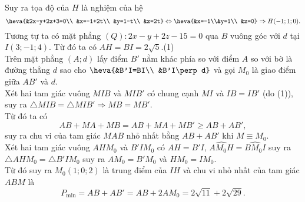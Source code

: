 \begin{ex}
{{
}
Suy ra tọa độ của $H$ là nghiệm của hệ
$$\heva{&2x-y+2z+3=0\\ &x=-1+2t\\ &y=1-t\\ &z=2t}\Leftrightarrow\heva{&x=-1\\&y=1\\ &z=0}\Rightarrow H(-1;1;0).$$
Tương tự ta có mặt phẳng $(Q): 2x-y+2z-15=0$ qua $B$ vuông góc với $d$ tại $I(3;-1;4)$. Từ đó ta có $AH=BI=2\sqrt{5}$.\hfill (1)\\
Trên mặt phẳng $(A;d)$ lấy điểm $B'$ nằm khác phía so với điểm $A$ so với bờ là đường thẳng $d$ sao cho $\heva{&B'I=BI\\ &B'I\perp d}$ và gọi $M_0$ là giao điểm giữa $AB'$ và $d$.\\
Xét hai tam giác vuông $MIB$ và $MIB'$ có chung cạnh $MI$ và $IB=IB'$ (do (1)), suy ra $\triangle MIB=\triangle MIB'\Rightarrow MB=MB'$.\\
Từ đó ta có 
$$AB+MA+MB=AB+MA+MB'\ge AB+AB',$$
suy ra chu vi của tam giác $MAB$ nhỏ nhất bằng $AB+AB'$ khi $M\equiv M_0$.\\
Xét hai tam giác vuông $AHM_0$ và $B'IM_0$ có $AH=B'I$, $\widehat{AM_0H}=\widehat{BM_0I}$ suy ra $\triangle AHM_0=\triangle B'IM_0$ suy ra $AM_0=B'M_0$ và $HM_0=IM_0$.\\
Từ đó suy ra $M_0(1;0;2)$ là trung điểm của $IH$ và chu vi nhỏ nhất của tam giác $ABM$ là
$$P_{\min}=AB+AB'=AB+2AM_0=2\sqrt{11}+2\sqrt{29}.$$
}
\end{ex}

